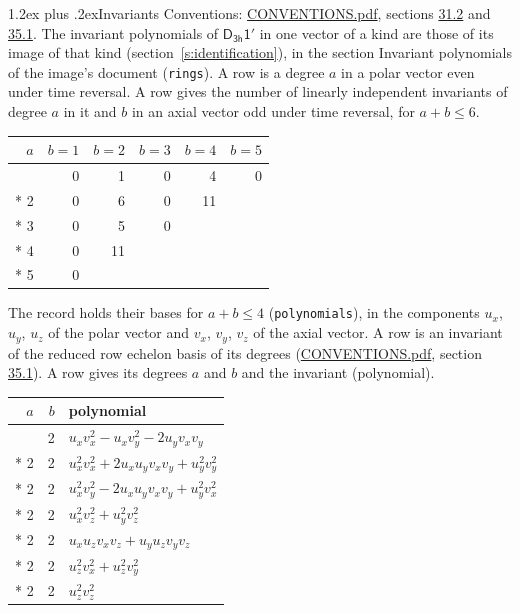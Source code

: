 \documentclass[10pt,a4paper]{article}
\makeatletter
\renewcommand\section{\@startsection{section}{1}{\z@}{-3ex plus -1ex minus -.2ex}%
  {1.2ex plus .2ex}{\normalfont\large\sffamily\bfseries\color{parttitle}}}
\numberwithin{equation}{section}
\newcommand{\grp}[1]{\mathsf{#1}}
\makeatother
\begin{document}
\section{Invariants}\label{s:invariants}
Conventions: \href{../../CONVENTIONS.pdf}{CONVENTIONS.pdf}, sections \href{../../CONVENTIONS.pdf\#conv.31.2}{31.2} and \href{../../CONVENTIONS.pdf\#conv.35.1}{35.1}.
The invariant polynomials of $\grp{D_{3h}1'}$ in one vector of a kind are those of its image of that kind (section~\ref{s:identification}), in the section Invariant polynomials of the image's document (\texttt{rings}).
\leavevmode\label{n:index.degree.polar}\label{n:index.degree.axial}A row is a degree $a$ in a polar vector even under time reversal. A row gives the number of linearly independent invariants of degree $a$ in it and $b$ in an axial vector odd under time reversal, for $a + b \le 6$.
{\small\begin{longtable}{@{}rrrrrr@{}}\toprule
$a$ & $b = 1$ & $b = 2$ & $b = 3$ & $b = 4$ & $b = 5$\\\midrule\endhead
\bottomrule\endfoot\endlastfoot
1 & 0 & 1 & 0 & 4 & 0\\*
2 & 0 & 6 & 0 & 11 & \\*
3 & 0 & 5 & 0 &  & \\*
4 & 0 & 11 &  &  & \\*
5 & 0 &  &  &  & \\
\bottomrule\end{longtable}}
\leavevmode\label{n:local.component.polar}\label{n:local.component.axial}The record holds their bases for $a + b \le 4$ (\texttt{polynomials}), in the components $u_{x}$, $u_{y}$, $u_{z}$ of the polar vector and $v_{x}$, $v_{y}$, $v_{z}$ of the axial vector. \label{n:head.polynomial}A row is an invariant of the reduced row echelon basis of its degrees (\href{../../CONVENTIONS.pdf}{CONVENTIONS.pdf}, section \href{../../CONVENTIONS.pdf\#conv.35.1}{35.1}). A row gives its degrees $a$ and $b$ and the invariant (polynomial).
{\small\renewcommand{\arraystretch}{1.2}\begin{longtable}{@{}rrl@{}}\toprule
$a$ & $b$ & polynomial\\\midrule\endhead
\bottomrule\endfoot\endlastfoot
1 & 2 & $u_{x}v_{x}^{2} - u_{x}v_{y}^{2} - 2u_{y}v_{x}v_{y}$\\*
2 & 2 & $u_{x}^{2}v_{x}^{2} + 2u_{x}u_{y}v_{x}v_{y} + u_{y}^{2}v_{y}^{2}$\\*
2 & 2 & $u_{x}^{2}v_{y}^{2} - 2u_{x}u_{y}v_{x}v_{y} + u_{y}^{2}v_{x}^{2}$\\*
2 & 2 & $u_{x}^{2}v_{z}^{2} + u_{y}^{2}v_{z}^{2}$\\*
2 & 2 & $u_{x}u_{z}v_{x}v_{z} + u_{y}u_{z}v_{y}v_{z}$\\*
2 & 2 & $u_{z}^{2}v_{x}^{2} + u_{z}^{2}v_{y}^{2}$\\*
2 & 2 & $u_{z}^{2}v_{z}^{2}$\\
\bottomrule\end{longtable}}
\end{document}
